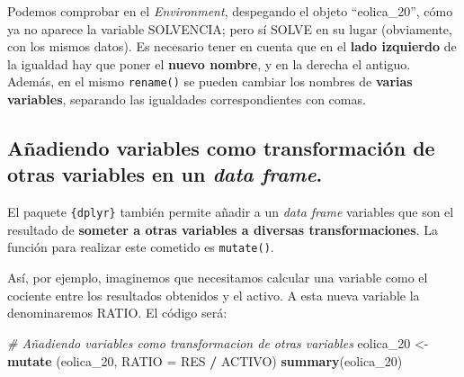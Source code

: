\documentclass[
]{book}
\newenvironment{Shaded}{\begin{snugshade}}{\end{snugshade}}
\newcommand{\AttributeTok}[1]{\textcolor[rgb]{0.13,0.29,0.53}{#1}}
\newcommand{\CommentTok}[1]{\textcolor[rgb]{0.56,0.35,0.01}{\textit{#1}}}
\newcommand{\FunctionTok}[1]{\textcolor[rgb]{0.13,0.29,0.53}{\textbf{#1}}}
\newcommand{\NormalTok}[1]{#1}
\newcommand{\OtherTok}[1]{\textcolor[rgb]{0.56,0.35,0.01}{#1}}
\newcommand{\SpecialCharTok}[1]{\textcolor[rgb]{0.81,0.36,0.00}{\textbf{#1}}}
\begin{document}
Podemos comprobar en el \emph{Environment}, despegando el objeto ``eolica\_20'', cómo ya no aparece la variable SOLVENCIA; pero sí SOLVE en su lugar (obviamente, con los mismos datos). Es necesario tener en cuenta que en el \textbf{lado izquierdo} de la igualdad hay que poner el \textbf{nuevo nombre}, y en la derecha el antiguo. Además, en el mismo \texttt{rename()} se pueden cambiar los nombres de \textbf{varias variables}, separando las igualdades correspondientes con comas.

\subsection{\texorpdfstring{\textbf{Añadiendo variables como transformación de otras variables en un \emph{data frame}.}}{Añadiendo variables como transformación de otras variables en un data frame.}}\label{auxf1adiendo-variables-como-transformaciuxf3n-de-otras-variables-en-un-data-frame.}

El paquete \texttt{\{dplyr\}} también permite añadir a un \emph{data frame} variables que son el resultado de \textbf{someter a otras variables a diversas transformaciones}. La función para realizar este cometido es \texttt{mutate()}.

Así, por ejemplo, imaginemos que necesitamos calcular una variable como el cociente entre los resultados obtenidos y el activo. A esta nueva variable la denominaremos RATIO. El código será:

\begin{Shaded}
\begin{Highlighting}[]
\CommentTok{\# Añadiendo variables como transformacion de otras variables}
\NormalTok{eolica\_20 }\OtherTok{\textless{}{-}} \FunctionTok{mutate}\NormalTok{ (eolica\_20, }\AttributeTok{RATIO =}\NormalTok{ RES }\SpecialCharTok{/}\NormalTok{ ACTIVO)}
\FunctionTok{summary}\NormalTok{(eolica\_20)}
\end{Highlighting}
\end{Shaded}
\end{document}
